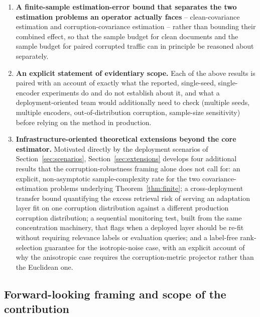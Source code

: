 \begin{enumerate}[leftmargin=1.6em]
 \item \textbf{A finite-sample estimation-error bound that separates the
 two estimation problems an operator actually faces} -- clean-covariance
 estimation and corruption-covariance estimation -- rather than bounding
 their combined effect, so that the sample budget for clean documents and
 the sample budget for paired corrupted traffic can in principle be
 reasoned about separately.

 \item \textbf{An explicit statement of evidentiary scope.} Each of the
 above results is paired with an account of exactly what the reported,
 single-seed, single-encoder experiments do and do not establish about it,
 and what a deployment-oriented team would additionally need to check
 (multiple seeds, multiple encoders, out-of-distribution corruption,
 sample-size sensitivity) before relying on the method in production.

 \item \textbf{Infrastructure-oriented theoretical extensions beyond the
 core estimator.} Motivated directly by the deployment scenarios of
 Section~\ref{sec:scenarios}, Section~\ref{sec:extensions} develops four
 additional results that the corruption-robustness framing alone does not
 call for: an explicit, non-asymptotic sample-complexity rate for the two
 covariance-estimation problems underlying Theorem~\ref{thm:finite}; a
 cross-deployment transfer bound quantifying the excess retrieval risk of
 serving an adaptation layer fit on one corruption distribution against a
 different production corruption distribution; a sequential monitoring
 test, built from the same concentration machinery, that flags when a
 deployed layer should be re-fit without requiring relevance labels or
 evaluation queries; and a label-free rank-selection guarantee for the
 isotropic-noise case, with an explicit account of why the anisotropic case
 requires the corruption-metric projector rather than the Euclidean one.
\end{enumerate}

\subsection{Forward-looking framing and scope of the contribution}

